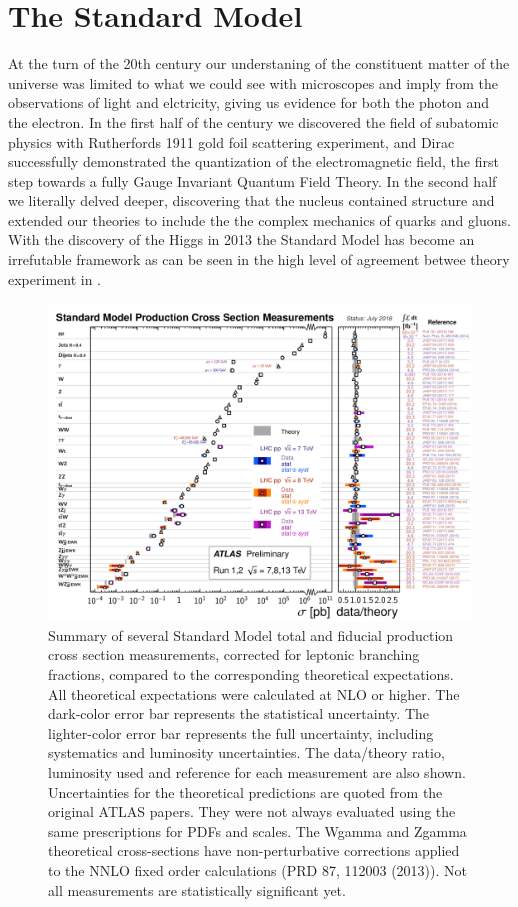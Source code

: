 \section{The Standard Model} \label{sec:theory:standardmodel}

At the turn of the 20th century our understaning of the constituent matter of
the universe was limited to what we could see with microscopes and imply from
the observations of light and elctricity, giving us evidence for both the photon
and the electron.  In the first half of the century we discovered the field of
subatomic physics with Rutherfords 1911 gold foil scattering experiment, and
Dirac successfully demonstrated the quantization of the electromagnetic field,
the first step towards a fully Gauge Invariant Quantum Field Theory.  In the
second half we literally delved deeper, discovering that the nucleus contained
structure and extended our theories to include the the complex mechanics of
quarks and gluons.  With the discovery of the Higgs in 2013 the Standard Model
has become an irrefutable framework as can be seen in the high level of
agreement betwee theory experiment in .

\begin{figure}[!htbp]
  \begin{center}
    \includegraphics[width=0.8\linewidth]{figures/theory/xsection_measurements.pdf}
    \caption{ Summary of several Standard Model total and fiducial production cross section measurements, corrected for leptonic branching fractions, compared to the corresponding theoretical expectations. All theoretical expectations were calculated at NLO or higher. The dark-color error bar represents the statistical uncertainty. The lighter-color error bar represents the full uncertainty, including systematics and luminosity uncertainties. The data/theory ratio, luminosity used and reference for each measurement are also shown. Uncertainties for the theoretical predictions are quoted from the original ATLAS papers. They were not always evaluated using the same prescriptions for PDFs and scales. The Wgamma and Zgamma theoretical cross-sections have non-perturbative corrections applied to the NNLO fixed order calculations (PRD 87, 112003 (2013)). Not all measurements are statistically significant yet.}
    \label{fig:xsection_measurements}
  \end{center}
\end{figure}

